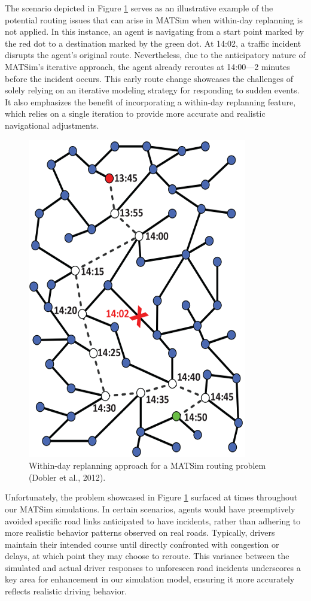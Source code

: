 \documentclass[fancy, oneside, mastersfancy, ms]{byuthesis}
\begin{document}
The scenario depicted in Figure \ref{fig-within-day} serves as an
illustrative example of the potential routing issues that can arise in
MATSim when within-day replanning is not applied. In this instance, an
agent is navigating from a start point marked by the red dot to a
destination marked by the green dot. At 14:02, a traffic incident
disrupts the agent's original route. Nevertheless, due to the
anticipatory nature of MATSim's iterative approach, the agent already
reroutes at 14:00---2 minutes before the incident occurs. This early
route change showcases the challenges of solely relying on an iterative
modeling strategy for responding to sudden events. It also emphasizes
the benefit of incorporating a within-day replanning feature, which
relies on a single iteration to provide more accurate and realistic
navigational adjustments.

\begin{figure}
\centering
\includegraphics{figures/within_day.png}
\caption[Within-day replanning approach for a MATSim routing problem.]{Within-day replanning approach for a MATSim routing problem (Dobler et al., 2012).}
\label{fig-within-day}
\end{figure}

Unfortunately, the problem showcased in Figure \ref{fig-within-day}
surfaced at times throughout our MATSim simulations. In certain
scenarios, agents would have preemptively avoided specific road links
anticipated to have incidents, rather than adhering to more realistic
behavior patterns observed on real roads. Typically, drivers maintain
their intended course until directly confronted with congestion or
delays, at which point they may choose to reroute. This variance between
the simulated and actual driver responses to unforeseen road incidents
underscores a key area for enhancement in our simulation model, ensuring
it more accurately reflects realistic driving behavior.
\end{document}
